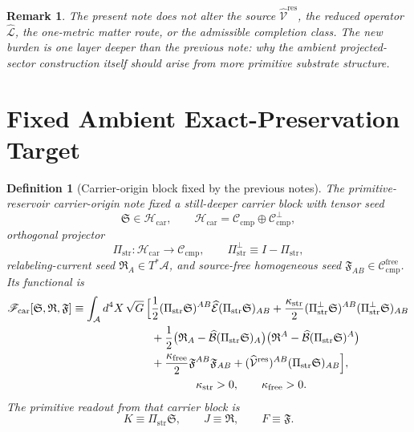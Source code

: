 \documentclass[11pt]{article}
\newcommand{\Sub}{\mathcal A}
\newcommand{\ResidualLift}{\widehat{\mathcal V}^{\mathrm{res}}}
\newcommand{\SubEinLin}{\widehat{\mathcal E}}
\newcommand{\SubGaugeVec}{\widehat{\mathcal B}}
\newcommand{\SubReducedEin}{\widehat{\mathcal L}}
\newcommand{\CompClass}{\mathscr C_{\mathrm{cmp}}}
\newcommand{\CompFree}{\mathscr C_{\mathrm{cmp}}^{\mathrm{free}}}
\newcommand{\CarrierFunctional}{\mathscr F_{\mathrm{car}}}
\newcommand{\FreeStiff}{\kappa_{\mathrm{free}}}
\newcommand{\PrimStrain}{K}
\newcommand{\PrimNeutral}{J}
\newcommand{\PrimFree}{F}
\newcommand{\CarrierClass}{\mathscr H_{\mathrm{car}}}
\newcommand{\CarrierProj}{\Pi_{\mathrm{str}}}
\newcommand{\CarrierPerp}{\Pi_{\mathrm{str}}^{\perp}}
\newcommand{\CarrierGap}{\kappa_{\mathrm{str}}}
\newcommand{\CarrierSeed}{\mathfrak S}
\newcommand{\RelabelSeed}{\mathfrak R}
\newcommand{\FreeSeed}{\mathfrak F}
\newtheorem{definition}{Definition}
\newtheorem{remark}{Remark}
\begin{document}
\begin{remark}
The present note does not alter the source \(\ResidualLift\), the reduced operator \(\SubReducedEin\), the one-metric matter route, or the admissible completion class. The new burden is one layer deeper than the previous note: why the ambient projected-sector construction itself should arise from more primitive substrate structure.
\end{remark}

\section{Fixed Ambient Exact-Preservation Target}

\begin{definition}[Carrier-origin block fixed by the previous notes]
\label{def:carrier}
The primitive-reservoir carrier-origin note fixed a still-deeper carrier block with tensor seed
\[
\CarrierSeed\in\CarrierClass,
\qquad
\CarrierClass=\CompClass\oplus \CompClass^\perp,
\]
orthogonal projector
\[
\CarrierProj:\CarrierClass\to\CompClass,
\qquad
\CarrierPerp\equiv I-\CarrierProj,
\]
relabeling-current seed \(\RelabelSeed_A\in T^*\Sub\), and source-free homogeneous seed \(\FreeSeed_{AB}\in\CompFree\). Its functional is
\begin{equation}
\begin{aligned}
\CarrierFunctional[\CarrierSeed,\RelabelSeed,\FreeSeed]
\equiv
\int_{\Sub} d^4X\,\sqrt{G}\,
\Bigl[
&\frac12 (\CarrierProj\CarrierSeed)^{AB}
\SubEinLin(\CarrierProj\CarrierSeed)_{AB}
+\frac{\CarrierGap}{2}(\CarrierPerp\CarrierSeed)^{AB}(\CarrierPerp\CarrierSeed)_{AB}
\\
&+\frac12\bigl(\RelabelSeed_A-\SubGaugeVec(\CarrierProj\CarrierSeed)_A\bigr)
\bigl(\RelabelSeed^A-\SubGaugeVec(\CarrierProj\CarrierSeed)^A\bigr)
\\
&+\frac{\FreeStiff}{2}\FreeSeed^{AB}\FreeSeed_{AB}
+(\ResidualLift)^{AB}(\CarrierProj\CarrierSeed)_{AB}
\Bigr],
\\
&\qquad\qquad \CarrierGap>0,\qquad \FreeStiff>0.
\end{aligned}
\label{eq:car}
\end{equation}
The primitive readout from that carrier block is
\begin{equation}
\PrimStrain\equiv \CarrierProj\CarrierSeed,
\qquad
\PrimNeutral\equiv \RelabelSeed,
\qquad
\PrimFree\equiv \FreeSeed.
\label{eq:readout}
\end{equation}
\end{definition}
\end{document}
